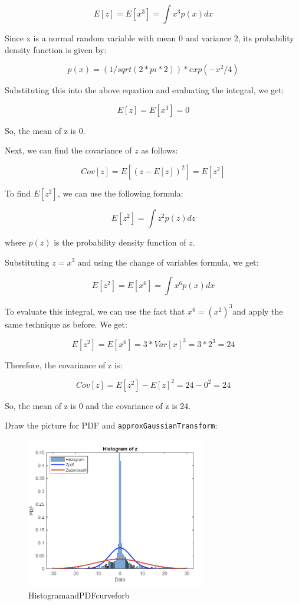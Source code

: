 $$E[z] = E[x^3] = \int x^3 p(x) dx$$

Since x is a normal random variable with mean 0 and variance 2, its probability density function is given by:

$$p(x) = (1 / sqrt(2 * pi * 2)) * exp(-x^2 / 4)
$$

Substituting this into the above equation and evaluating the integral, we get:

$$E[z] = E[x^3] = 0
$$

So, the mean of z is 0.

Next, we can find the covariance of $z$ as follows:

$$Cov[z] = E[(z - E[z])^2] = E[z^2]
$$

To find $E[z^2]$, we can use the following formula:

$$E[z^2] = \int z^2 p(z) dz
$$

where $p(z)$ is the probability density function of $z$.

Substituting $z = x^3$ and using the change of variables formula, we get:

$$E[z^2] = E[x^6] = \int x^6 p(x) dx
$$

To evaluate this integral, we can use the fact that $x^6 = (x^2)^3 $and apply the same technique as before. We get:

$$E[z^2] = E[x^6] = 3 * Var[x]^3 = 3 * 2^3 = 24
$$

Therefore, the covariance of z is:

$$Cov[z] = E[z^2] - E[z]^2 = 24 - 0^2 = 24
$$

So, the mean of z is 0 and the covariance of z is 24.

Draw the picture for PDF and \texttt{approxGaussianTransform}:

\begin{figure}[H]
 \centering
 \includegraphics[width=0.7\textwidth]{images/HistogramandPDFcurveforb.png}
 \caption{HistogramandPDFcurveforb}
 \label{2b}
\end{figure}

